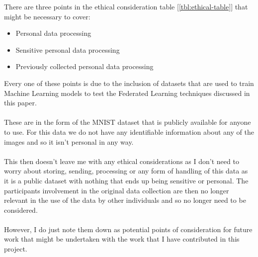 There are three points in the ethical consideration table [\ref{tbl:ethical-table}] that might be necessary to cover:
\begin{itemize}
    \item Personal data processing
    \item Sensitive personal data processing
    \item Previously collected personal data processing
\end{itemize}
Every one of these points is due to the inclusion of datasets that are used to train Machine Learning models to test the Federated Learning techniques discussed in this paper.\\ \\
These are in the form of the MNIST dataset that is publicly available for anyone to use. 
For this data we do not have any identifiable information about any of the images and so it isn't personal in any way.
\\ \\
This then doesn't leave me with any ethical considerations as I don't need to worry about storing, sending, processing or any form of handling of this data as it is a public dataset with nothing that ends up being sensitive or personal. 
The participants involvement in the original data collection are then no longer relevant in the use of the data by other individuals and so no longer need to be considered.
\\ \\
However, I do just note them down as potential points of consideration for future work that might be undertaken with the work that I have contributed in this project.